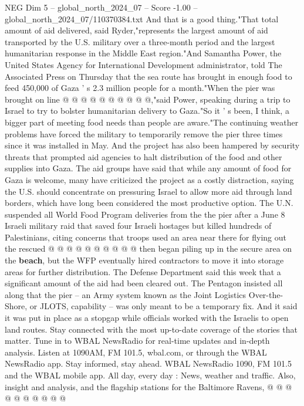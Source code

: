 \begin{textsample}{NEG Dim 5 – global\_north\_2024\_07 – Score -1.00 – global\_north\_2024\_07/110370384.txt}
And that is a good thing."That total amount of aid delivered, said Ryder,"represents the largest amount of aid transported by the U.S. military over a three-month period and the largest humanitarian response in the Middle East region."And Samantha Power, the United States Agency for International Development administrator, told The Associated Press on Thursday that the sea route has brought in enough food to feed 450,000 of Gaza ' s 2.3 million people for a month."When the pier was brought on line @ @ @ @ @ @ @ @ @ @,"said Power, speaking during a trip to Israel to try to bolster humanitarian delivery to Gaza."So it ' s been, I think, a bigger part of meeting food needs than people are aware."The continuing weather problems have forced the military to temporarily remove the pier three times since it was installed in May.
And the project has also been hampered by security threats that prompted aid agencies to halt distribution of the food and other supplies into Gaza.
The aid groups have said that while any amount of food for Gaza is welcome, many have criticized the project as a costly distraction, saying the U.S. should concentrate on pressuring Israel to allow more aid through land borders, which have long been considered the most productive option.
The U.N. suspended all World Food Program deliveries from the the pier after a June 8 Israeli military raid that saved four Israeli hostages but killed hundreds of Palestinians, citing concerns that troops used an area near there for flying out the rescued @ @ @ @ @ @ @ @ @ @ then began piling up in the secure area on the \textbf{beach}, but the WFP eventually hired contractors to move it into storage areas for further distribution.
The Defense Department said this week that a significant amount of the aid had been cleared out.
The Pentagon insisted all along that the pier -- an Army system known as the Joint Logistics Over-the-Shore, or JLOTS, capability -- was only meant to be a temporary fix.
And it said it was put in place as a stopgap while officials worked with the Israelis to open land routes.
Stay connected with the most up-to-date coverage of the stories that matter.
Tune in to WBAL NewsRadio for real-time updates and in-depth analysis.
Listen at 1090AM, FM 101.5, wbal.com, or through the WBAL NewsRadio app.
Stay informed, stay ahead.
WBAL NewsRadio 1090, FM 101.5 and the WBAL mobile app.
All day, every day : News, weather and traffic.
Also, insight and analysis, and the flagship stations for the Baltimore Ravens, @ @ @ @ @ @ @ @ @ @

\end{textsample}
